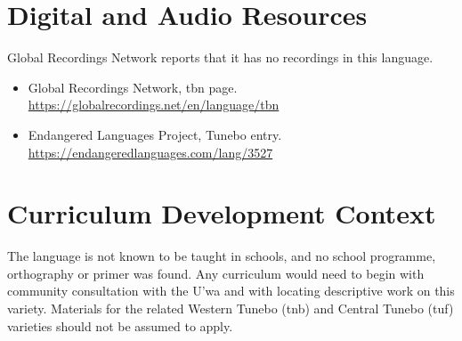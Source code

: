 \documentclass[12pt]{article}
\begin{document}
\section{Digital and Audio Resources}
Global Recordings Network reports that it has no recordings in this language.
\begin{itemize}
\item Global Recordings Network, tbn page. \url{https://globalrecordings.net/en/language/tbn}
\item Endangered Languages Project, Tunebo entry. \url{https://endangeredlanguages.com/lang/3527}
\end{itemize}

\section{Curriculum Development Context}
The language is not known to be taught in schools, and no school programme, orthography or primer was found. Any curriculum would need to begin with community consultation with the U'wa and with locating descriptive work on this variety. Materials for the related Western Tunebo (tnb) and Central Tunebo (tuf) varieties should not be assumed to apply.
\end{document}
